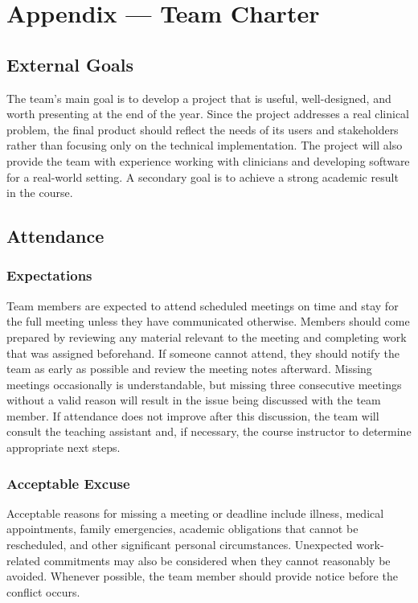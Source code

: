 \documentclass{article}
\begin{document}
\newpage{}

\section{Appendix --- Team Charter}

\subsection*{External Goals}

The team's main goal is to develop a project that is useful, well-designed, and
worth presenting at the end of the year. Since the project addresses a real clinical problem,
the final product should reflect the needs of its users and stakeholders rather than focusing
only on the technical implementation. The project will also provide the team with experience
working with clinicians and developing software for a real-world setting. A secondary goal
is to achieve a strong academic result in the course.

\subsection*{Attendance}

\subsubsection*{Expectations}

Team members are expected to attend scheduled meetings on time and stay for the full meeting
unless they have communicated otherwise. Members should come prepared by reviewing any material
relevant to the meeting and completing work that was assigned beforehand. If someone cannot attend,
they should notify the team as early as possible and review the meeting notes afterward.
Missing meetings occasionally is understandable, but missing three consecutive meetings without
a valid reason will result in the issue being discussed with the team member. If attendance does not
improve after this discussion, the team will consult the teaching assistant and, if necessary, the
course instructor to determine appropriate next steps.

\subsubsection*{Acceptable Excuse}

Acceptable reasons for missing a meeting or deadline include illness, medical appointments,
family emergencies, academic obligations that cannot be rescheduled, and other significant
personal circumstances. Unexpected work-related commitments may also be considered when they
cannot reasonably be avoided. Whenever possible, the team member should provide notice before
the conflict occurs.
\end{document}
